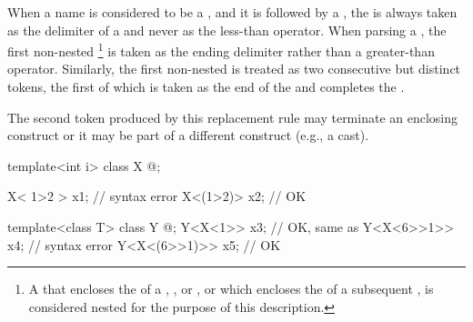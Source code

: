 \pnum
{}%
When a name is considered to be a
,
and it is followed by a \tcode{<},
the \tcode{<}
is always taken as the delimiter of a
and never as the less-than operator.
When parsing a ,
the first non-nested
\tcode{>}\footnote{A \tcode{>} that encloses the 
of a , , 
or , or which encloses the 
of a subsequent , is considered nested for the purpose
of this description.
}
is taken as the ending delimiter
rather than a greater-than operator.
Similarly, the first non-nested \tcode{>{>}} is treated as two
consecutive but distinct \tcode{>} tokens, the first of which is taken
as the end of the  and completes
the .
\begin{note}
The second \tcode{>}
token produced by this replacement rule may terminate an enclosing
 construct or it may be part of a different
construct (e.g., a cast).
\end{note}
\begin{example}
\begin{codeblock}
template<int i> class X { @\commentellip@ };

X< 1>2 > x1;                            // syntax error
X<(1>2)> x2;                            // OK

template<class T> class Y { @\commentellip@ };
Y<X<1>> x3;                             // OK, same as 
Y<X<6>>1>> x4;                          // syntax error
Y<X<(6>>1)>> x5;                        // OK
\end{codeblock}
\end{example}

